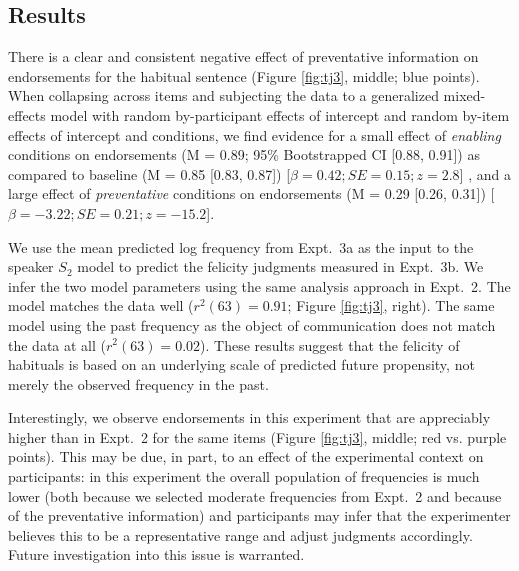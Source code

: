 \documentclass[10pt,letterpaper]{article}
\newcommand{\ndg}[1]{\textcolor{Green}{[ndg: #1]}}
\newcommand{\mht}[1]{\textcolor{DarkOrange}{[mht: #1]}}
\begin{document}
\subsection{Results}

There is a clear and consistent negative effect of preventative information on endorsements for the habitual sentence (Figure \ref{fig:tj3}, middle; blue points).
When collapsing across items and subjecting the data to a generalized mixed-effects model with random by-participant effects of intercept and random by-item effects of intercept and conditions, we find evidence for a small effect of \emph{enabling} conditions on endorsements (M =  0.89; 95\% Bootstrapped CI [0.88, 0.91]) as compared to baseline (M = 0.85 [0.83, 0.87]) [$\beta = 0.42; SE = 0.15; z = 2.8$]%
, and a large effect of \emph{preventative} conditions on endorsements (M = 0.29 [0.26, 0.31]) [$ \beta = -3.22; SE = 0.21; z = -15.2$].%

We use the mean predicted log frequency from Expt.~3a as the input to the speaker $S_2$ model to predict the felicity judgments measured in Expt.~3b.
We infer the two model parameters using the same analysis approach in Expt.~2. 
The model matches the data well ($r^2(63) = 0.91$; Figure \ref{fig:tj3}, right).
The same model using the past frequency as the object of communication does not match the data at all ($r^2(63) = 0.02$).
These results suggest that the felicity of habituals is based on an underlying scale of predicted future propensity, not merely the observed frequency in the past.

Interestingly, we observe endorsements in this experiment that are appreciably higher than in Expt.~2 for the same items (Figure \ref{fig:tj3}, middle; red vs. purple points). 
This may be due, in part, to an effect of the experimental context on participants: 
in this experiment the overall population of frequencies is much lower (both because we selected moderate frequencies from Expt.~2 and because of the preventative information) and participants may infer that the experimenter believes this to be a representative range and adjust judgments accordingly. Future investigation into this issue is warranted.

\end{document}
